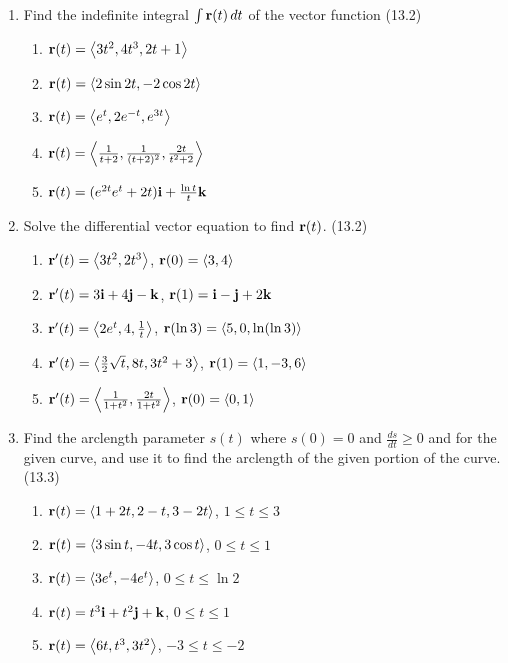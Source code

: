 \begin{enumerate}
    \newpage

    \item Find the indefinite integral $\int\mathbf{r}(t)\,d{t}$ of the vector function (13.2)

      \begin{enumerate}
        \item $\mathbf{r}(t) = \left<3t^2, 4t^3, 2t+1\right>$
        \item $\mathbf{r}(t) = \left<2\sin2t,-2\cos2t\right>$
        \item $\mathbf{r}(t) = \left<e^t, 2e^{-t}, e^{3t} \right>$
        \item $\mathbf{r}(t) = \left<\frac{1}{t+2}, \frac{1}{(t+2)^2}, \frac{2t}{t^2+2}\right>$
        \item $\mathbf{r}(t) = (e^{2t}e^t + 2t)\mathbf{i} + \frac{\ln t}{t}\mathbf{k}$
      \end{enumerate}

    \item Solve the differential vector equation to find $\mathbf{r}(t)$. (13.2)

      \begin{enumerate}
        \item $\mathbf{r}'(t) = \left<3t^2, 2t^3\right>$, $\mathbf{r}(0) = \left<3,4\right>$
        \item $\mathbf{r}'(t) = 3\mathbf{i}+4\mathbf{j}-\mathbf{k}$, $\mathbf{r}(1)=\mathbf{i}-\mathbf{j}+2\mathbf{k}$
        \item $\mathbf{r}'(t) = \left<2e^t, 4, \frac{1}{t}\right>$, $\mathbf{r}(\ln 3)=\left<5, 0, \ln(\ln 3)\right>$
        \item $\mathbf{r}'(t) = \left<\frac{3}{2}\sqrt{t}, 8t, 3t^2+3\right>$, $\mathbf{r}(1) = \left<1, -3, 6\right>$
        \item $\mathbf{r}'(t) = \left<\frac{1}{1+t^2},\frac{2t}{1+t^2}\right>$, $\mathbf{r}(0) = \left<0, 1\right>$
      \end{enumerate}

    \item Find the arclength parameter $s(t)$ where $s(0)=0$ and $\frac{ds}{dt}\geq 0$ and for the given curve, and use it to find the arclength of the given portion of the curve. (13.3)

      \begin{enumerate}
        \item $\mathbf{r}(t) = \left<1+2t, 2-t, 3-2t\right>$, $1\leq t\leq 3$
        \item $\mathbf{r}(t) = \left< 3\sin t, -4t, 3\cos t \right>$, $0\leq t\leq 1$
        \item $\mathbf{r}(t) = \left<3e^t, -4e^t\right>$, $0\leq t\leq \ln 2$
        \item $\mathbf{r}(t) = t^3\mathbf{i} + t^2\mathbf{j} + \mathbf{k}$, $0\leq t\leq 1$
        \item $\mathbf{r}(t) = \left<6t, t^3, 3t^2\right>$, $-3\leq t\leq -2$
      \end{enumerate}


\end{enumerate}
